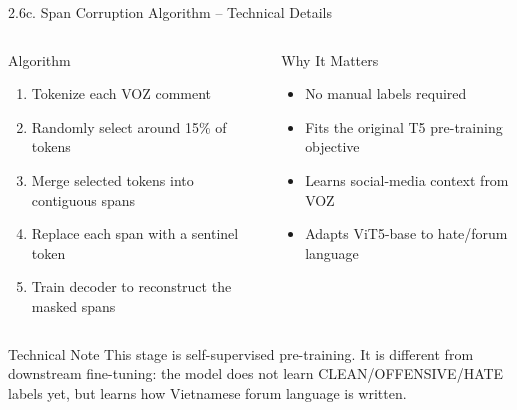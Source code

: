 \documentclass[11pt, aspectratio=169]{beamer}
\begin{document}
\begin{frame}[fragile, shrink=10]{2.6c. Span Corruption Algorithm -- Technical Details}

\begin{columns}[T]
  \begin{block}{Algorithm}
    \begin{enumerate}
      \item Tokenize each VOZ comment
      \item Randomly select around 15\% of tokens
      \item Merge selected tokens into contiguous spans
      \item Replace each span with a sentinel token
      \item Train decoder to reconstruct the masked spans
    \end{enumerate}
  \end{block}

  \begin{block}{Why It Matters}
    \begin{itemize}
      \item No manual labels required
      \item Fits the original T5 pre-training objective
      \item Learns social-media context from VOZ
      \item Adapts ViT5-base to hate/forum language
    \end{itemize}
  \end{block}
\end{columns}

\vspace{0.3cm}
\begin{block}{Technical Note}
  This stage is self-supervised pre-training. It is different from downstream fine-tuning: the model does not learn CLEAN/OFFENSIVE/HATE labels yet, but learns how Vietnamese forum language is written.
\end{block}
\end{frame}
\end{document}
